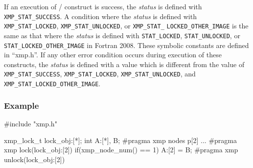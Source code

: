 If an execution of {\tt {}}/{\tt {}} construct is success,
the {\it status} is defined with {\tt XMP\_STAT\_SUCCESS}.
A condition where the {\it status} is defined with 
{\tt XMP\_STAT\_LOCKED}, {\tt XMP\_STAT\_UNLOCKED}, or {\tt XMP\_STAT\_}
{\tt LOCKED\_OTHER\_IMAGE} 
is the same as that where the {\it status} is defined with
{\tt STAT\_LOCKED}, {\tt STAT\_UNLOCKED}, or {\tt STAT\_LOCKED\_OTHER\_IMAGE} in Fortran 2008.
These symbolic constants are defined in ``xmp.h''.
If any other error condition occurs during execution of these constructs,
the {\it status} is defined with a value which is different from the
value of {\tt XMP\_STAT\_SUCCESS}, {\tt XMP\_STAT\_LOCKED}, 
{\tt XMP\_STAT\_UNLOCKED}, and {\tt XMP\_STAT\_LOCKED\_OTHER\_IMAGE}.


\subsubsection*{Example}
\begin{XCexample}
#include "xmp.h"

xmp_lock_t lock_obj:[*];
int A:[*], B;
#pragma xmp nodes p[2]
...
#pragma xmp lock(lock_obj:[2])
  if(xmp_node_num() == 1){
    A:[2] = B;
  }
#pragma xmp unlock(lock_obj:[2])
\end{XCexample}

